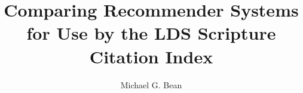 \documentclass[12pt]{report}
\begin{document}
\title{Comparing Recommender Systems for Use by the LDS Scripture Citation Index}
\author{Michael G. Bean}

\showBYUHeader


%

%
%
%
%
%












\end{document}
